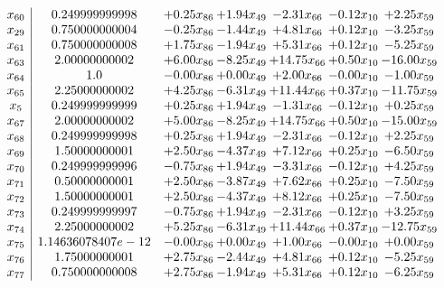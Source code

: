 \documentclass[8pt]{article}
\begin{document}
\[\begin{array}{c| c c@{\hskip 2pt} c@{\hskip 2pt} c@{\hskip 2pt} c@{\hskip 2pt} c@{\hskip 2pt} }
 x_{60}   &  0.249999999998 & +  0.25 x_{86} & +  1.94 x_{49} & -2.31 x_{66} & -0.12 x_{10} & +  2.25 x_{59}\\
 x_{29}   &  0.750000000004 & -0.25 x_{86} & -1.44 x_{49} & +  4.81 x_{66} & +  0.12 x_{10} & -3.25 x_{59}\\
 x_{61}   &  0.750000000008 & +  1.75 x_{86} & -1.94 x_{49} & +  5.31 x_{66} & +  0.12 x_{10} & -5.25 x_{59}\\
 x_{63}   &  2.00000000002 & +  6.00 x_{86} & -8.25 x_{49} & + 14.75 x_{66} & +  0.50 x_{10} & -16.00 x_{59}\\
 x_{64}   &  1.0 & -0.00 x_{86} & +  0.00 x_{49} & +  2.00 x_{66} & -0.00 x_{10} & -1.00 x_{59}\\
 x_{65}   &  2.25000000002 & +  4.25 x_{86} & -6.31 x_{49} & + 11.44 x_{66} & +  0.37 x_{10} & -11.75 x_{59}\\
 x_{5}   &  0.249999999999 & +  0.25 x_{86} & +  1.94 x_{49} & -1.31 x_{66} & -0.12 x_{10} & +  0.25 x_{59}\\
 x_{67}   &  2.00000000002 & +  5.00 x_{86} & -8.25 x_{49} & + 14.75 x_{66} & +  0.50 x_{10} & -15.00 x_{59}\\
 x_{68}   &  0.249999999998 & +  0.25 x_{86} & +  1.94 x_{49} & -2.31 x_{66} & -0.12 x_{10} & +  2.25 x_{59}\\
 x_{69}   &  1.50000000001 & +  2.50 x_{86} & -4.37 x_{49} & +  7.12 x_{66} & +  0.25 x_{10} & -6.50 x_{59}\\
 x_{70}   &  0.249999999996 & -0.75 x_{86} & +  1.94 x_{49} & -3.31 x_{66} & -0.12 x_{10} & +  4.25 x_{59}\\
 x_{71}   &  0.50000000001 & +  2.50 x_{86} & -3.87 x_{49} & +  7.62 x_{66} & +  0.25 x_{10} & -7.50 x_{59}\\
 x_{72}   &  1.50000000001 & +  2.50 x_{86} & -4.37 x_{49} & +  8.12 x_{66} & +  0.25 x_{10} & -7.50 x_{59}\\
 x_{73}   &  0.249999999997 & -0.75 x_{86} & +  1.94 x_{49} & -2.31 x_{66} & -0.12 x_{10} & +  3.25 x_{59}\\
 x_{74}   &  2.25000000002 & +  5.25 x_{86} & -6.31 x_{49} & + 11.44 x_{66} & +  0.37 x_{10} & -12.75 x_{59}\\
 x_{75}   &  1.14636078407e-12 & -0.00 x_{86} & +  0.00 x_{49} & +  1.00 x_{66} & -0.00 x_{10} & +  0.00 x_{59}\\
 x_{76}   &  1.75000000001 & +  2.75 x_{86} & -2.44 x_{49} & +  4.81 x_{66} & +  0.12 x_{10} & -5.25 x_{59}\\
 x_{77}   &  0.750000000008 & +  2.75 x_{86} & -1.94 x_{49} & +  5.31 x_{66} & +  0.12 x_{10} & -6.25 x_{59}\\

\end{array}\]
\end{document}
